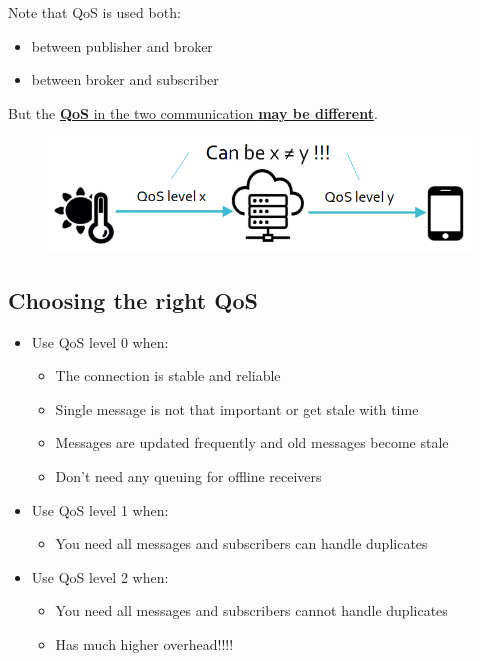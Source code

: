 {Note that QoS is used both:
\ns
\begin{itemize}
   \item between publisher and broker
   \item between broker and subscriber
\end{itemize}
But the \ul{\textbf{QoS} in the two communication \textbf{may be different}}.
}
\begin{figure}[htbp]
   \centering
   \includegraphics{images/qos_different.png}
   \label{fig:qos_different}
\end{figure}

\subsection{Choosing the right QoS}
\begin{itemize}
   \item Use QoS level 0 when:
   \begin{itemize}
      \item The connection is stable and reliable
      \item Single message is not that important or get stale with
      time
      \item Messages are updated frequently and old messages
      become stale
      \item Don’t need any queuing for offline receivers
   \end{itemize}
      \item Use QoS level 1 when:
   \begin{itemize}
      \item You need all messages and subscribers can handle
      duplicates
   \end{itemize}
   \item Use QoS level 2 when:
   \begin{itemize}
      \item You need all messages and subscribers cannot handle
      duplicates
      \item Has much higher overhead!!!!
   \end{itemize}
\end{itemize}

